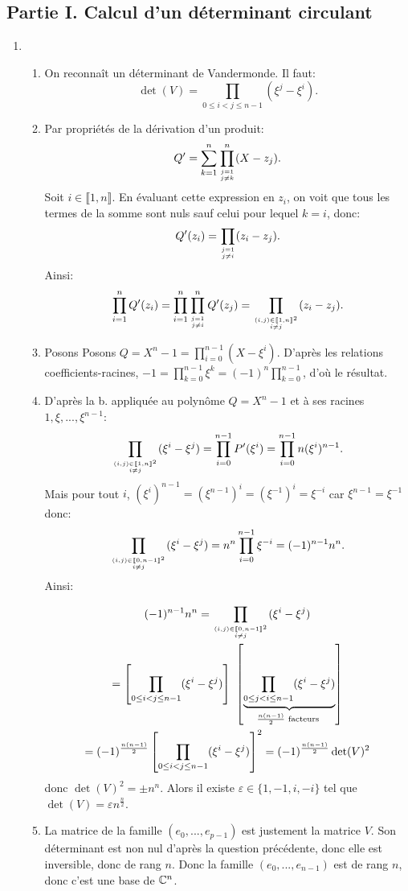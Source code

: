 
\subsection*{Partie I. Calcul d'un déterminant circulant}


\begin{enumerate}
\item 
\begin{enumerate}
  \item On reconnaît un déterminant de Vandermonde. Il faut:
  \[ \det(V) = \prod_{0\leq i < j \leq n-1}(\xi^{j} - \xi^{i}).\]
  \item Par propriétés de la dérivation d'un produit:
  \[ Q' = \sum_{k=1}^{n}\prod_{j= 1\atop j\neq k}^{n}(X-z_{j}).\]
  Soit $i\in \llbracket 1, n\rrbracket$. En évaluant cette expression en $z_{i}$, on voit que tous les termes de la somme sont nuls sauf celui pour lequel $k = i$, donc:
  \[ Q'(z_{i}) = \prod_{j=1 \atop j\neq i}(z_{i}-z_{j}).\]
  Ainsi:
  \[ \prod_{i=1}^{n}Q'(z_{i}) = \prod_{i=1}^{n}\prod_{j=1\atop j\neq i}^{n}Q'(z_{j}) = \prod_{(i, j)\in \llbracket 1, n\rrbracket^{2}\atop i\neq j}(z_{i} - z_{j}).\]
  \item Posons Posons $Q = X^{n}-1 = \prod_{i=0}^{n-1}(X - \xi^{i})$. D'après les relations coefficients-racines, $-1 = \prod_{k=0}^{n-1}\xi^{k} = (-1)^{n}\prod_{k=0}^{n-1}$, d'où le résultat.
  \item  D'après la b. appliquée au polynôme $Q = X^{n}-1$ et à ses racines $1, \xi, ..., \xi^{n-1}$:
  \[ \prod_{(i, j)\in \llbracket 1, n\rrbracket^{2} \atop i\neq j}(\xi^{i}-\xi^{j}) = \prod_{i=0}^{n-1}P'(\xi^{i}) = \prod_{i=0}^{n-1}n(\xi^{i})^{n-1}.\]
  Mais pour tout $i$, $(\xi^{i})^{n-1} = (\xi^{n-1})^{i} = (\xi^{-1})^{i} = \xi^{-i}$ car $\xi^{n-1} = \xi^{-1}$ donc:
  \[ \prod_{(i, j)\in \llbracket 0, n-1\rrbracket^{2} \atop i\neq j}(\xi^{i}-\xi^{j}) = n^{n}\prod_{i=0}^{n-1}\xi^{-i}=(-1)^{n-1}n^{n}.\]
  Ainsi:

\begin{multline*}
  (-1)^{n-1}n^{n}  = \prod_{(i, j)\in \llbracket 0, n-1\rrbracket^{2} \atop i\neq j}(\xi^{i}-\xi^{j}) \\ 
   = \left [\prod_{0\leq i < j \leq n-1}(\xi^{i}-\xi^{j})\right ] \ \left [\underbrace{\prod_{0\leq j < i \leq n-1}(\xi^{i}-\xi^{j})}_{\frac{n(n-1)}{2} \text{ facteurs }}\right ] \\
   = (-1)^{\frac{n(n-1)}{2}}\left [\prod_{0\leq i < j \leq n-1}(\xi^{i}-\xi^{j})\right ]^{2} 
   = (-1)^{\frac{n(n-1)}{2}}\det(V)^{2}
\end{multline*}
  donc $\det(V)^{2} = \pm n^{n}$. Alors il existe $\varepsilon \in \{ 1, -1, i, -i\}$ tel que $\det(V) = \varepsilon n^{\frac{n}{2}}$.
  \item La matrice de la famille $(e_{0}, ..., e_{p-1})$ est justement la matrice $V$. Son déterminant est non nul d'après la question précédente, donc elle est inversible, donc de rang $n$. Donc la famille $(e_{0}, ..., e_{n-1})$ est de rang $n$, donc c'est une base de $\mathbb{C}^{n}$.
  \end{enumerate}
  

\end{enumerate}
